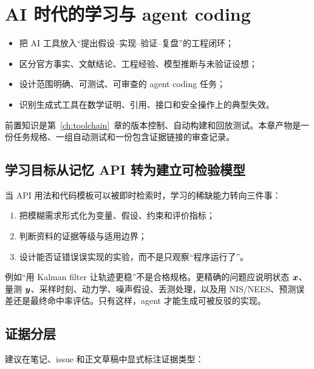 \chapter{AI 时代的学习与 agent coding}
\label{ch:ai-agent}

\begin{learningobjectives}
\begin{itemize}
  \item 把 AI 工具放入“提出假设--实现--验证--复盘”的工程闭环；
  \item 区分官方事实、文献结论、工程经验、模型推断与未验证设想；
  \item 设计范围明确、可测试、可审查的 agent coding 任务；
  \item 识别生成式工具在数学证明、引用、接口和安全操作上的典型失效。
\end{itemize}
\end{learningobjectives}

\begin{prerequisites}
前置知识是第~\ref{ch:toolchain}~章的版本控制、自动构建和回放测试。本章产物是一份任务规格、一组自动测试和一份包含证据链接的审查记录。
\end{prerequisites}

\section{学习目标从记忆 API 转为建立可检验模型}

当 API 用法和代码模板可以被即时检索时，学习的稀缺能力转向三件事：

\begin{enumerate}
  \item 把模糊需求形式化为变量、假设、约束和评价指标；
  \item 判断资料的证据等级与适用边界；
  \item 设计能否证错误误实现的实验，而不是只观察“程序运行了”。
\end{enumerate}

例如“用 Kalman filter 让轨迹更稳”不是合格规格。更精确的问题应说明状态 $\bm{x}$、量测 $\bm{y}$、采样时刻、动力学、噪声假设、丢测处理，以及用 NIS/NEES、预测误差还是最终命中率评估。只有这样，agent 才能生成可被反驳的实现。

\section{证据分层}

建议在笔记、issue 和正文草稿中显式标注证据类型：

